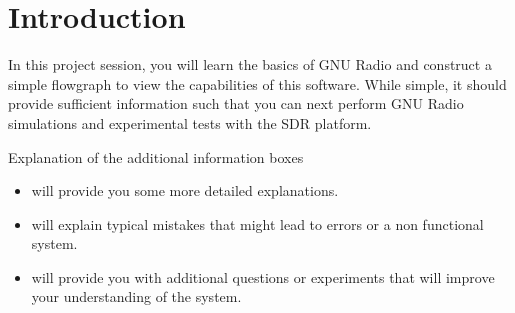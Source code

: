 \section*{Introduction}

In this project session, you will learn the basics of GNU Radio and construct a simple flowgraph to view the capabilities of this software. While simple, it should provide sufficient information such that you can next perform GNU Radio simulations and experimental tests with the SDR platform.

\begin{bclogo}[couleur = gray!20, arrondi = 0.2, logo=\bcinfo]{Explanation of the additional information boxes}
\begin{itemize}
    \item \bcinfo will provide you some more detailed explanations.
    \item \bcattention will explain typical mistakes that might lead to errors or a non functional system.
    \item \bcquestion will provide you with additional questions or experiments that will improve your understanding of the system.
\end{itemize}
\end{bclogo}
